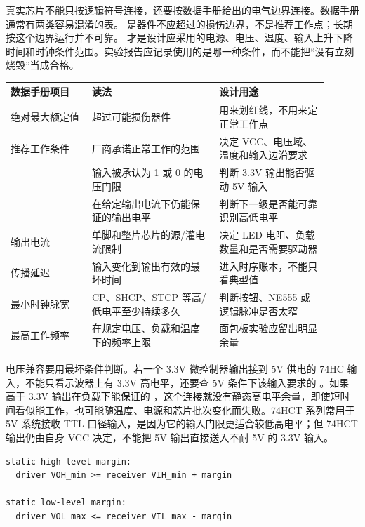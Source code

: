 
真实芯片不能只按逻辑符号连接，还要按数据手册给出的电气边界连接。数据手册通常有两类容易混淆的表。 是器件不应超过的损伤边界，不是推荐工作点；长期按这个边界运行并不可靠。 才是设计应采用的电源、电压、温度、输入上升下降时间和时钟条件范围。实验报告应记录使用的是哪一种条件，而不能把“没有立刻烧毁”当成合格。

\begin{longtable}{L{0.23\linewidth}L{0.36\linewidth}L{0.31\linewidth}}
\toprule
数据手册项目 & 读法 & 设计用途 \\
\midrule
绝对最大额定值 & 超过可能损伤器件 & 用来划红线，不用来定正常工作点 \\
推荐工作条件 & 厂商承诺正常工作的范围 & 决定 VCC、电压域、温度和输入边沿要求 \\
 & 输入被承认为 1 或 0 的电压门限 & 判断 3.3V 输出能否驱动 5V 输入 \\
 & 在给定输出电流下仍能保证的输出电平 & 判断下一级是否能可靠识别高低电平 \\
输出电流 & 单脚和整片芯片的源/灌电流限制 & 决定 LED 电阻、负载数量和是否需要驱动器 \\
传播延迟 & 输入变化到输出有效的最坏时间 & 进入时序账本，不能只看典型值 \\
最小时钟脉宽 & CP、SHCP、STCP 等高/低电平至少持续多久 & 判断按钮、NE555 或逻辑脉冲是否太窄 \\
最高工作频率 & 在规定电压、负载和温度下的频率上限 & 面包板实验应留出明显余量 \\
\bottomrule
\end{longtable}

电压兼容要用最坏条件判断。若一个 3.3V 微控制器输出接到 5V 供电的 74HC 输入，不能只看示波器上有 3.3V 高电平，还要查 5V 条件下该输入要求的 。如果  高于 3.3V 输出在负载下能保证的 ，这个连接就没有静态高电平余量，即使短时间看似能工作，也可能随温度、电源和芯片批次变化而失败。74HCT 系列常用于 5V 系统接收 TTL 口径输入，是因为它的输入门限更适合较低高电平；但 74HCT 输出仍由自身 VCC 决定，不能把 5V 输出直接送入不耐 5V 的 3.3V 输入。

\begin{lstlisting}
static high-level margin:
  driver VOH_min >= receiver VIH_min + margin

static low-level margin:
  driver VOL_max <= receiver VIL_max - margin
\end{lstlisting}

